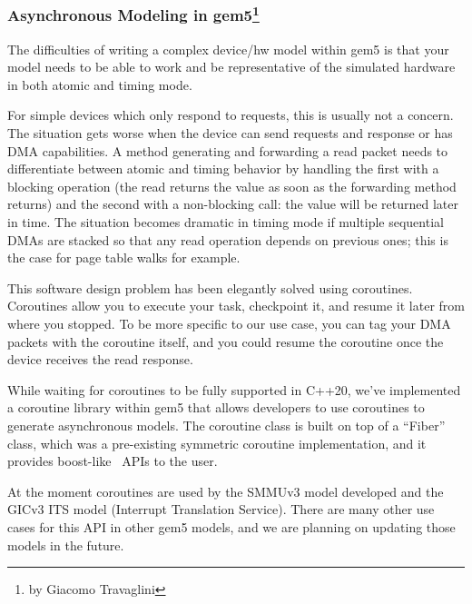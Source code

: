 \subsubsection[Asynchronous Modeling in gem5]{Asynchronous Modeling in gem5\footnote{by Giacomo Travaglini}}

The difficulties of writing a complex device/hw model within gem5 is that your model needs to be able to work and be representative of the simulated hardware in both atomic and timing mode.

For simple devices which only respond to requests, this is usually not a concern.
The situation gets worse when the device can send requests and response or has DMA capabilities.
A method generating and forwarding a read packet needs to differentiate between atomic and timing behavior by handling the first with a blocking operation (the read returns the value as soon as the forwarding method returns) and the second with a non-blocking call: the value will be returned later in time.
The situation becomes dramatic in timing mode if multiple sequential DMAs are stacked so that any read operation depends on previous ones; this is the case for page table walks for example.

This software design problem has been elegantly solved using coroutines.
Coroutines allow you to execute your task, checkpoint it, and resume it later from where you stopped.
To be more specific to our use case, you can tag your DMA packets with the coroutine itself, and you could resume the coroutine once the device receives the read response.

While waiting for coroutines to be fully supported in C++20, we've implemented a coroutine library within gem5 that allows developers to use coroutines to generate asynchronous models.
The coroutine class is built on top of a ``Fiber'' class, which was a pre-existing symmetric coroutine implementation, and it provides boost-like~\cite{} APIs to the user.

At the moment coroutines are used by the SMMUv3 model developed and the GICv3 ITS model (Interrupt Translation Service).
There are many other use cases for this API in other gem5 models, and we are planning on updating those models in the future.
